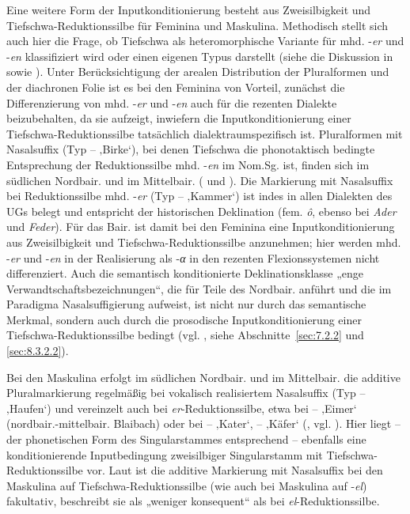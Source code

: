 Eine weitere Form der Inputkonditionierung besteht aus Zweisilbigkeit und Tiefschwa-Reduktionssilbe für Feminina und Maskulina. Methodisch stellt sich auch hier die Frage, ob Tiefschwa als heteromorphische Variante für mhd. \mbox{-\textit{er}} und -\textit{en} klassifiziert wird oder einen eigenen Typus darstellt (siehe die Diskussion in  sowie \citealt[128, 166--168]{Rowley1997}). Unter Berücksichtigung der arealen Distribution der Pluralformen und der diachronen Folie ist es bei den Feminina von Vorteil, zunächst die Differenzierung von mhd. -\textit{er} und -\textit{en} auch für die rezenten Dialekte beizubehalten, da sie aufzeigt, inwiefern die Inputkonditionierung einer Tiefschwa-Reduktionssilbe tatsächlich dialektraumspezifisch ist. Pluralformen mit Nasalsuffix (Typ  --  ‚Birke‘), bei denen Tiefschwa die phonotaktisch bedingte Entsprechung der Reduktionssilbe mhd. -\textit{en} im Nom.Sg. ist, finden sich im südlichen Nordbair. und im Mittelbair. ( und ). Die Markierung mit Nasalsuffix bei Reduktionssilbe mhd. \mbox{-\textit{er}} (Typ  --  ‚Kammer‘) ist indes in allen Dialekten des UGs belegt und entspricht der historischen Deklination (fem. \textit{ô}, ebenso bei \textit{Ader} und \textit{Feder}). Für das Bair. ist damit bei den Feminina eine Inputkonditionierung aus Zweisilbigkeit und Tiefschwa-Reduktionssilbe anzunehmen; hier werden mhd. \mbox{-\textit{er}} und -\textit{en} in der Realisierung als -\textit{α} in den rezenten Flexionssystemen nicht differenziert. Auch die semantisch konditionierte Deklinationsklasse „enge Verwandtschaftsbezeichnungen“, die \citet[137]{Rowley1997} für Teile des Nordbair. anführt und die im Paradigma Nasalsuffigierung aufweist, ist nicht nur durch das semantische Merkmal, sondern auch durch die prosodische Inputkonditionierung einer Tiefschwa-Reduktionssilbe bedingt (vgl. \citealt[170]{Rowley1997}, siehe Abschnitte~\ref{sec:7.2.2} und \ref{sec:8.3.2.2}).


Bei den Maskulina erfolgt im südlichen Nordbair. und im Mittelbair. die additive Pluralmarkierung regelmäßig bei vokalisch realisiertem Nasalsuffix (Typ  --  ‚Haufen‘) und vereinzelt auch bei \textit{er}{}-Reduktionssilbe, etwa bei  --  ‚Eimer‘ (nordbair.-mittelbair. Blaibach) oder bei  --  ‚Kater‘,  --  ‚Käfer‘ (\citealt[128 und 154]{Rowley1997}, vgl. \citealt[§38]{Kollmer1985}). Hier liegt -- der phonetischen Form des Singularstammes entsprechend -- ebenfalls eine konditionierende Inputbedingung zweisilbiger Singularstamm mit Tiefschwa-Reduktionssilbe vor. Laut \citet[153]{Rowley1997} ist die additive Markierung mit Nasalsuffix bei den Maskulina auf Tiefschwa-Reduktionssilbe (wie auch bei Maskulina auf -\textit{el}) fakultativ, \citet[421]{Schirmunski1962} beschreibt sie als „weniger konsequent“ als bei \textit{el}{}-Reduktionssilbe.


